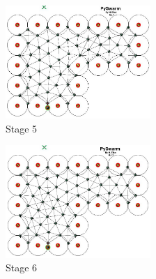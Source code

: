 \documentclass[10pt,journal,letterpaper,twoside]{IEEEtran}
\begin{document}
\begin{figure}
\begin{center}
\includegraphics[width=5.5cm]{figures/EXPAND5}
\end{center}
\caption{Stage 5\label{emerge:Expand5}}
\end{figure}

\begin{figure}
\begin{center}
\includegraphics[width=5.5cm]{figures/EXPAND6}
\end{center}
\caption{Stage 6\label{emerge:Expand6}}
\end{figure}

\end{document}
